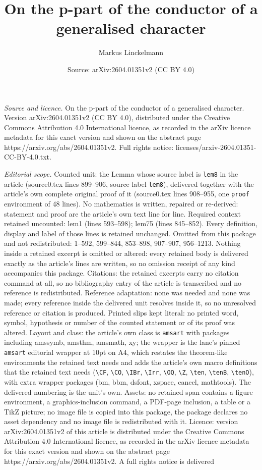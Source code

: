 \documentclass[10pt,a4paper]{amsart}
\title[On the p-part of the conductor of a generalised character]{On the p-part of the conductor of a generalised character}
\author{Markus Linckelmann}
\date{Source: arXiv:2604.01351v2 (CC BY 4.0)}
\begin{document}
\maketitle

\noindent\emph{Source and licence.} On the p-part of the conductor of a generalised character. Version arXiv:2604.01351v2 (CC BY 4.0), distributed under the Creative Commons Attribution 4.0 International licence, as recorded in the arXiv licence metadata for this exact version and shown on the abstract page https://arxiv.org/abs/2604.01351v2. Full rights notice: licenses/arxiv-2604.01351-CC-BY-4.0.txt.\par\smallskip

\noindent\textit{Editorial scope.} Counted unit: the Lemma whose source label is \texttt{lem8} in the article (source0.tex lines 899--906, source label \texttt{lem8}), delivered together with the article's own complete original proof of it (source0.tex lines 908--955, one \texttt{proof} environment of 48 lines). No mathematics is written, repaired or re-derived: statement and proof are the article's own text line for line. Required context retained uncounted: lem1 (lines 593--598); lem75 (lines 845--852). Every definition, display and label of those lines is retained unchanged. Omitted from this package and not redistributed: 1--592, 599--844, 853--898, 907--907, 956--1213. Nothing inside a retained excerpt is omitted or altered: every retained body is delivered exactly as the article's lines are written, so no omission receipt of any kind accompanies this package. Citations: the retained excerpts carry no citation command at all, so no bibliography entry of the article is transcribed and no reference is redistributed. Reference adaptation: none was needed and none was made; every reference inside the delivered unit resolves inside it, so no unresolved reference or citation is produced. Printed slips kept literal: no printed word, symbol, hypothesis or number of the counted statement or of its proof was altered. Layout and class: the article's own class is \texttt{amsart} with packages including amssymb, amsthm, amsmath, xy; the wrapper is the lane's pinned \texttt{amsart} editorial wrapper at 10pt on A4, which restates the theorem-like environments the retained text needs and adds the article's own macro definitions that the retained text needs (\texttt{\textbackslash CF}, \texttt{\textbackslash CO}, \texttt{\textbackslash IBr}, \texttt{\textbackslash Irr}, \texttt{\textbackslash OQ}, \texttt{\textbackslash Z}, \texttt{\textbackslash ten}, \texttt{\textbackslash tenB}, \texttt{\textbackslash tenO}), with extra wrapper packages (bm, bbm, dsfont, xspace, cancel, mathtools). The delivered numbering is the unit's own. Assets: no retained span contains a figure environment, a graphics-inclusion command, a PDF-page inclusion, a table or a TikZ picture; no image file is copied into this package, the package declares no asset dependency and no image file is redistributed with it. Licence: version arXiv:2604.01351v2 of this article is distributed under the Creative Commons Attribution 4.0 International licence, as recorded in the arXiv licence metadata for this exact version and shown on the abstract page https://arxiv.org/abs/2604.01351v2. A full rights notice is delivered 
\end{document}
